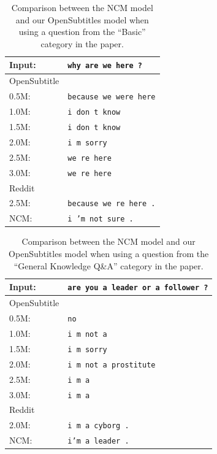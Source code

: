 \begin{table}[H]
	\centering
	\begin{adjustbox}{max width=\textwidth}
		\begin{tabular}{ll}
			\toprule
			Input: 	& \texttt{why are we here ?}\\
			\midrule
			OpenSubtitle\\
			0.5M: 	& \texttt{because we were here}\\
			1.0M: 	& \texttt{i don t know}\\
			1.5M:	& \texttt{i don t know}\\
			2.0M:	& \texttt{i m sorry}\\
			2.5M:	& \texttt{we re here}\\
			3.0M:	& \texttt{we re here}\\
			\midrule
			Reddit\\
			2.5M:	& \texttt{because we re here .}\\
			\midrule
			NCM:	& \texttt{i ’m not sure .}\\
			\bottomrule
		\end{tabular}
	\end{adjustbox}
	\caption{Comparison between the NCM model and our OpenSubtitles model when using a question from the ``Basic'' category in the paper.}
	\label{results:example9_output:Neural_Conversational_Model_compared}
\end{table}
\begin{table}[H]
	\centering
	\begin{adjustbox}{max width=\textwidth}
		\begin{tabular}{ll}
			\toprule
			Input: 	& \texttt{are you a leader or a follower ?}\\
			\midrule
			OpenSubtitle\\
			0.5M: 	& \texttt{no}\\
			1.0M: 	& \texttt{i m not a}\\
			1.5M:	& \texttt{i m sorry}\\
			2.0M:	& \texttt{i m not a prostitute}\\
			2.5M:	& \texttt{i m a}\\
			3.0M:	& \texttt{i m a}\\
			\midrule
			Reddit\\
			2.0M:	& \texttt{i m a cyborg .}\\
			\midrule
			NCM:	& \texttt{i'm a leader .}\\
			\bottomrule
		\end{tabular}
	\end{adjustbox}
	\caption{Comparison between the NCM model and our OpenSubtitles model when using a question from the ``General Knowledge Q\&A'' category in the paper.}
	\label{results:example10_output:Neural_Conversational_Model_compared}
\end{table}
